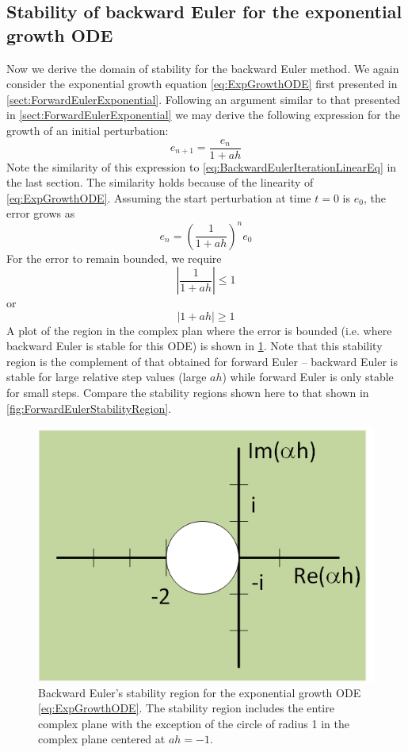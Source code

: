\documentclass[hidelinks,notitlepage]{book}
\begin{document}
\subsection{Stability of backward Euler for the exponential growth ODE}
Now we derive the domain of stability for the backward Euler method.  We again consider the exponential growth equation \cref{eq:ExpGrowthODE} first presented in \cref{sect:ForwardEulerExponential}.  Following an argument similar to that presented in \cref{sect:ForwardEulerExponential} we may derive the following expression for the growth of an initial perturbation:
\begin{equation}
\nonumber
e_{n+1} = \frac{e_n}{1 + a h}
\end{equation}
Note the similarity of this expression to \cref{eq:BackwardEulerIterationLinearEq} in the last section.  The similarity holds because of the linearity of \cref{eq:ExpGrowthODE}.  
Assuming the start perturbation at time $t=0$ is $e_0$, the error grows as
\begin{equation}
e_n = \left( \frac{1}{1+a h} \right)^n e_0
\end{equation}
For the error to remain bounded, we require
\begin{equation}
\nonumber
\left| \frac{1}{1+a h} \right| \le 1
\end{equation}
or
\begin{equation}
\left| 1+a h \right| \ge 1
\end{equation}
A plot of the region in the complex plan where the error is bounded (i.e. where backward Euler is stable for this ODE) is shown in \cref{fig:BackwardEulerStabilityRegion}.  Note that this stability region is the complement of that obtained for forward Euler -- backward Euler is stable for large relative step values (large $a h$) while forward Euler is only stable for small steps.  Compare the stability regions shown here to that shown in \cref{fig:ForwardEulerStabilityRegion}.
\begin{figure}[tbh]
	\centering
	\includegraphics[width=0.5\columnwidth]{BackwardEulerStabilityRegion.png}
	\caption{Backward Euler's stability region for the exponential growth ODE \cref{eq:ExpGrowthODE}.  The stability region includes the entire complex plane with the exception of the circle of radius 1 in the complex plane centered at $a h = -1$.}
	\label{fig:BackwardEulerStabilityRegion}
\end{figure}
\end{document}
